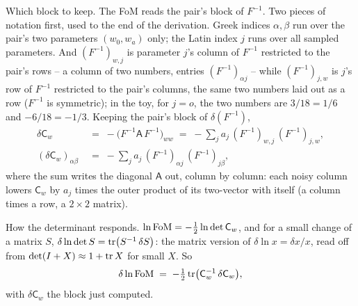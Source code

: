 \documentclass[11pt]{article}
\newcommand{\Cov}{\mathsf{C}}
\begin{document}
Which block to keep.  The FoM reads the pair's block of $F^{-1}$.
Two pieces of notation first, used to the end of the derivation.
Greek indices $\alpha, \beta$ run over the pair's two parameters
$(w_0, w_a)$ only; the Latin index $j$ runs over all sampled
parameters.  And $(F^{-1})_{w,j}$ is parameter $j$'s column of
$F^{-1}$ restricted to the pair's rows -- a column of two numbers,
entries $(F^{-1})_{\alpha j}$ -- while $(F^{-1})_{j,w}$ is $j$'s row
of $F^{-1}$ restricted to the pair's columns, the same two numbers
laid out as a row ($F^{-1}$ is symmetric); in the toy, for $j = o$,
the two numbers are $3/18 = 1/6$ and $-6/18 = -1/3$.  Keeping the
pair's block of $\delta(F^{-1})$,
\begin{align*}
  \delta\Cov_w \;&=\; -\bigl(F^{-1}\mathsf{A}\,F^{-1}\bigr)_{ww}
  \;=\; -\sum_j a_j\,(F^{-1})_{w,j}\,(F^{-1})_{j,w} ,
  \\
  (\delta\Cov_w)_{\alpha\beta}
  \;&=\; -\sum_j a_j\,(F^{-1})_{\alpha j}\,(F^{-1})_{j\beta} ,
\end{align*}
where the sum writes the diagonal $\mathsf{A}$ out, column by column:
each noisy column lowers $\Cov_w$ by $a_j$ times the outer product of
its two-vector with itself (a column times a row, a $2 \times 2$
matrix).

How the determinant responds.  $\ln{\rm FoM} =
-\tfrac{1}{2}\ln\det\Cov_w$, and for a small change of a matrix $S$,
$\delta\ln\det S = {\rm tr}\bigl(S^{-1}\,\delta S\bigr)$: the matrix
version of $\delta\ln x = \delta x/x$, read off from
$\det(I + X) \approx 1 + {\rm tr}\,X$ for small $X$.  So
\begin{equation*}
  \delta\ln{\rm FoM}
  \;=\; -\tfrac{1}{2}\,
  {\rm tr}\bigl(\Cov_w^{-1}\,\delta\Cov_w\bigr) ,
\end{equation*}
with $\delta\Cov_w$ the block just computed.
\end{document}
